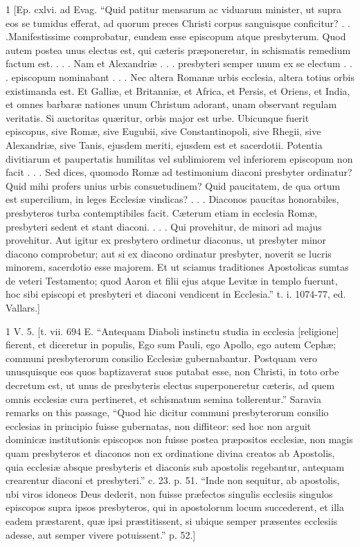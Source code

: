 1
[Ep. cxlvi. ad Evag. “Quid patitur mensarum ac viduarum minister, ut supra eos se tumidus efferat, ad quorum preces Christi corpus sanguisque conficitur? . . .Manifestissime comprobatur, eundem esse episcopum atque presbyterum. Quod autem postea unus electus est, qui cæteris præponeretur, in schismatis remedium factum est. . . . Nam et Alexandriæ . . . presbyteri semper unum ex se electum . . . episcopum nominabant . . . Nec altera Romanæ urbis ecclesia, altera totius orbis existimanda est. Et Galliæ, et Britanniæ, et Africa, et Persis, et Oriens, et India, et omnes barbaræ nationes unum Christum adorant, unam observant regulam veritatis. Si auctoritas quæritur, orbis major est urbe. Ubicunque fuerit episcopus, sive Romæ, sive Eugubii, sive Constantinopoli, sive Rhegii, sive Alexandriæ, sive Tanis, ejusdem meriti, ejusdem est et sacerdotii. Potentia divitiarum et paupertatis humilitas vel sublimiorem vel inferiorem episcopum non facit . . . Sed dices, quomodo Romæ ad testimonium diaconi presbyter ordinatur? Quid mihi profers unius urbis consuetudinem? Quid paucitatem, de qua ortum est supercilium, in leges Ecclesiæ vindicas? . . . Diaconos paucitas honorabiles, presbyteros turba contemptibiles facit. Cæterum etiam in ecclesia Romæ, presbyteri sedent et stant diaconi. . . . Qui provehitur, de minori ad majus provehitur. Aut igitur ex presbytero ordinetur diaconus, ut presbyter minor diacono comprobetur; aut si ex diacono ordinatur presbyter, noverit se lucris minorem, sacerdotio esse majorem. Et ut sciamus traditiones Apostolicas sumtas de veteri Testamento; quod Aaron et filii ejus atque Levitæ in templo fuerunt, hoc sibi episcopi et presbyteri et diaconi vendicent in Ecclesia.” t. i. 1074-77, ed. Vallars.]

1
V. 5. [t. vii. 694 E. “Antequam Diaboli instinctu studia in ecclesia [religione] fierent, et diceretur in populis, Ego sum Pauli, ego Apollo, ego autem Cephæ; communi presbyterorum consilio Ecclesiæ gubernabantur. Postquam vero unusquisque eos quos baptizaverat suos putabat esse, non Christi, in toto orbe decretum est, ut unus de presbyteris electus superponeretur cæteris, ad quem omnis ecclesiæ cura pertineret, et schismatum semina tollerentur.” Saravia remarks on this passage, “Quod hic dicitur communi presbyterorum consilio ecclesias in principio fuisse gubernatas, non diffiteor: sed hoc non arguit dominicæ institutionis episcopos non fuisse postea præpositos ecclesiæ, non magis quam presbyteros et diaconos non ex ordinatione divina creatos ab Apostolis, quia ecclesiæ absque presbyteris et diaconis sub apostolis regebantur, antequam crearentur diaconi et presbyteri.” c. 23. p. 51. “Inde non sequitur, ab apostolis, ubi viros idoneos Deus dederit, non fuisse præfectos singulis ecclesiis singulos episcopos supra ipsos presbyteros, qui in apostolorum locum succederent, et illa eadem præstarent, quæ ipsi præstitissent, si ubique semper præsentes ecclesiis adesse, aut semper vivere potuissent.” p. 52.]

